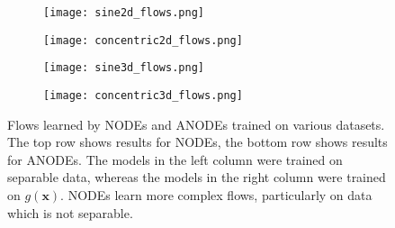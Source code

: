 \documentclass{article}
\begin{document}
\begin{figure}[t]
\centering
\begin{subfigure}[t]{0.35\linewidth}
\centering
\texttt{[image: sine2d\_flows.png]}
\end{subfigure}
\begin{subfigure}[t]{0.35\linewidth}
\centering
\texttt{[image: concentric2d\_flows.png]}
\end{subfigure}
\begin{subfigure}[t]{0.35\linewidth}
\centering
\texttt{[image: sine3d\_flows.png]}
\end{subfigure}
\begin{subfigure}[t]{0.35\linewidth}
\centering
\texttt{[image: concentric3d\_flows.png]}
\end{subfigure}
\caption{Flows learned by NODEs and ANODEs trained on various datasets. The top row shows results for NODEs, the bottom row shows results for ANODEs. The models in the left column were trained on separable data, whereas the models in the right column were trained on $g(\mathbf{x})$. NODEs learn more complex flows, particularly on data which is not separable.}
\label{all-flows-fig}
\end{figure}
\end{document}
